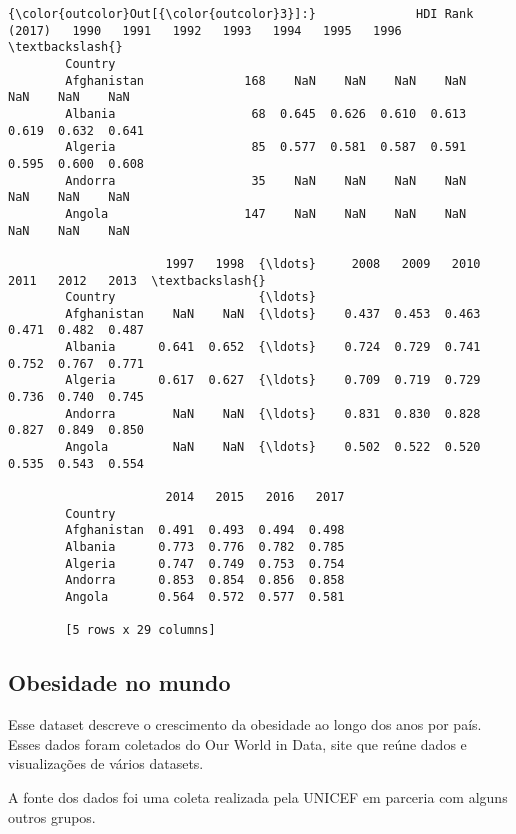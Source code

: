 \documentclass[11pt]{article}
\begin{document}
\begin{Verbatim}[commandchars=\\\{\}]
{\color{outcolor}Out[{\color{outcolor}3}]:}              HDI Rank (2017)   1990   1991   1992   1993   1994   1995   1996  \textbackslash{}
        Country                                                                         
        Afghanistan              168    NaN    NaN    NaN    NaN    NaN    NaN    NaN   
        Albania                   68  0.645  0.626  0.610  0.613  0.619  0.632  0.641   
        Algeria                   85  0.577  0.581  0.587  0.591  0.595  0.600  0.608   
        Andorra                   35    NaN    NaN    NaN    NaN    NaN    NaN    NaN   
        Angola                   147    NaN    NaN    NaN    NaN    NaN    NaN    NaN   
        
                      1997   1998  {\ldots}     2008   2009   2010   2011   2012   2013  \textbackslash{}
        Country                    {\ldots}                                               
        Afghanistan    NaN    NaN  {\ldots}    0.437  0.453  0.463  0.471  0.482  0.487   
        Albania      0.641  0.652  {\ldots}    0.724  0.729  0.741  0.752  0.767  0.771   
        Algeria      0.617  0.627  {\ldots}    0.709  0.719  0.729  0.736  0.740  0.745   
        Andorra        NaN    NaN  {\ldots}    0.831  0.830  0.828  0.827  0.849  0.850   
        Angola         NaN    NaN  {\ldots}    0.502  0.522  0.520  0.535  0.543  0.554   
        
                      2014   2015   2016   2017  
        Country                                  
        Afghanistan  0.491  0.493  0.494  0.498  
        Albania      0.773  0.776  0.782  0.785  
        Algeria      0.747  0.749  0.753  0.754  
        Andorra      0.853  0.854  0.856  0.858  
        Angola       0.564  0.572  0.577  0.581  
        
        [5 rows x 29 columns]
\end{Verbatim}
            
    \subsection{Obesidade no mundo}\label{obesidade-no-mundo}

Esse dataset descreve o crescimento da obesidade ao longo dos anos por
país. Esses dados foram coletados do Our World in Data, site que reúne
dados e visualizações de vários datasets.

A fonte dos dados foi uma coleta realizada pela UNICEF em parceria com
alguns outros grupos.
\end{document}
